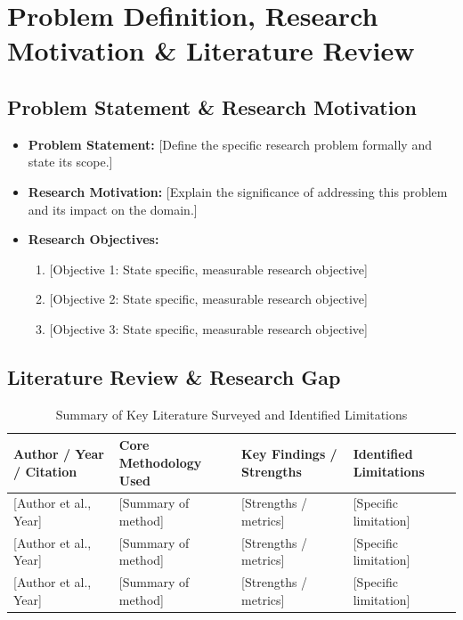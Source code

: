 \documentclass[11pt, a4paper]{article}
\begin{document}
\section{Problem Definition, Research Motivation \& Literature Review}

\subsection{Problem Statement \& Research Motivation}
\begin{itemize}[noitemsep, topsep=2pt]
    \item \textbf{Problem Statement:} {[Define the specific research problem formally and state its scope.]}
    \item \textbf{Research Motivation:} {[Explain the significance of addressing this problem and its impact on the domain.]}
    \item \textbf{Research Objectives:}
    \begin{enumerate}[noitemsep, topsep=2pt]
        \item {[Objective 1: State specific, measurable research objective]}
        \item {[Objective 2: State specific, measurable research objective]}
        \item {[Objective 3: State specific, measurable research objective]}
    \end{enumerate}
\end{itemize}

\subsection{Literature Review \& Research Gap}

\begin{table}[H]
    \centering
    \footnotesize
    \renewcommand{\arraystretch}{1.25}
    \begin{tabular}{|p{2.8cm}|p{4.2cm}|p{4.2cm}|p{3.2cm}|}
        \hline
        \textbf{Author / Year / Citation} & \textbf{Core Methodology Used} & \textbf{Key Findings / Strengths} & \textbf{Identified Limitations} \\
        \hline
        {[Author et al., Year]} \cite{ref1} & {[Summary of method]} & {[Strengths / metrics]} & {[Specific limitation]} \\
        \hline
        {[Author et al., Year]} \cite{ref2} & {[Summary of method]} & {[Strengths / metrics]} & {[Specific limitation]} \\
        \hline
        {[Author et al., Year]} \cite{ref3} & {[Summary of method]} & {[Strengths / metrics]} & {[Specific limitation]} \\
        \hline
    \end{tabular}
    \caption{Summary of Key Literature Surveyed and Identified Limitations}
\end{table}
\end{document}
